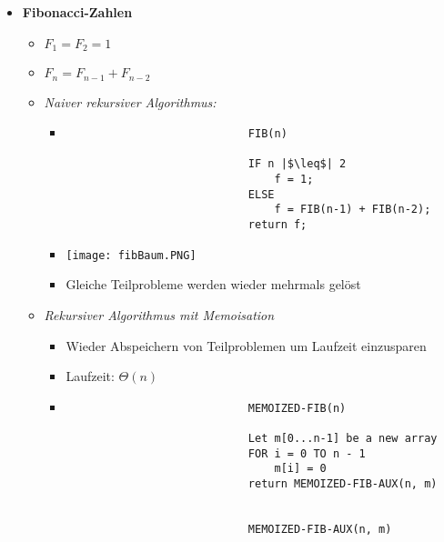 \begin{itemize}
        \item \textbf{Fibonacci-Zahlen}
            \begin{itemize}
                \item $F_1 = F_2 = 1$
                \item $F_n = F_{n-1} + F_{n-2}$
                \item \textit{Naiver rekursiver Algorithmus:}
                    \begin{itemize}
                        \item[]
                            \begin{verbatim}
                            FIB(n)
                            
                            IF n |$\leq$| 2
                                f = 1;
                            ELSE
                                f = FIB(n-1) + FIB(n-2);
                            return f;
                            \end{verbatim}
                            \item[] \texttt{[image: fibBaum.PNG]}
                            \item[] Gleiche Teilprobleme werden wieder mehrmals gelöst  
                    \end{itemize}
\pagebreak
                \item \textit{Rekursiver Algorithmus mit Memoisation}
                    \begin{itemize}
                        \item Wieder Abspeichern von Teilproblemen um Laufzeit einzusparen
                        \item Laufzeit: $\Theta(n)$
                        \item[]
                            \begin{verbatim}
                            MEMOIZED-FIB(n)

                            Let m[0...n-1] be a new array
                            FOR i = 0 TO n - 1
                                m[i] = 0
                            return MEMOIZED-FIB-AUX(n, m)


                            MEMOIZED-FIB-AUX(n, m)


\end{verbatim}
\end{itemize}
\end{itemize}
\end{itemize}
